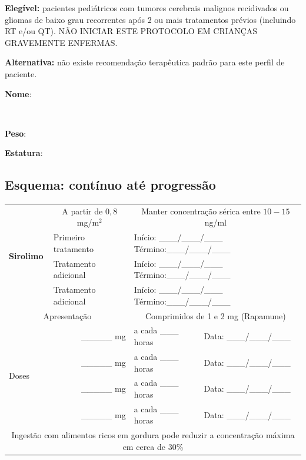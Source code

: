 \documentclass[11pt,a4paper,oldfontcommands]{memoir}
\def\entrywithlabel[#1]#2{\parbox{#1}{{\small #2:} \hrulefill}}
\begin{document}
\textbf{Elegível:} pacientes pediátricos com tumores cerebrais malignos recidivados ou gliomas de baixo grau recorrentes após 2 ou mais tratamentos prévios (incluindo RT e/ou QT). NÃO INICIAR ESTE PROTOCOLO EM CRIANÇAS GRAVEMENTE ENFERMAS.

\textbf{Alternativa:} não existe recomendação terapêutica padrão para este perfil de paciente.
\\[0.4cm]
\entrywithlabel[1\hsize]{\textbf{Nome}}\hfill
\\[0.3cm]
\entrywithlabel[.45\hsize]{\textbf{Peso}}\hfill  \entrywithlabel[.45\hsize]{\textbf{Estatura}}

\subsection{Esquema: contínuo até progressão}
\begin{center}
\begin{table}[H]
	\begin{tabular}{p{2.0cm}|p{4.0cm}|p{5.0cm}p{3.5cm}}
    \hline
		\multirow{4}{*}{\textbf{Sirolimo}}&\multicolumn{1}{c|}{A partir de \(0,8\) mg/m\(^2\)}&\multicolumn{2}{c}{Manter concentração sérica entre \(10-15\) ng/ml}\\
		{}&{Primeiro tratamento}&\multicolumn{2}{l}{Início: \_\_\_/\_\_\_/\_\_\_ Término:\_\_\_/\_\_\_/\_\_\_}\\
		{}&{Tratamento adicional}&\multicolumn{2}{l}{Início: \_\_\_/\_\_\_/\_\_\_ Término:\_\_\_/\_\_\_/\_\_\_}\\
		{}&{Tratamento adicional}&\multicolumn{2}{l}{Início: \_\_\_/\_\_\_/\_\_\_ Término:\_\_\_/\_\_\_/\_\_\_}\\
    \hline
		\multicolumn{2}{c|}{Apresentação}&\multicolumn{2}{c}{Comprimidos de 1 e 2 mg (Rapamune)}\\
    \hline
		\multirow{4}{*}{Doses}&\multicolumn{1}{r}{\_\_\_\_\_ mg}&{a cada \_\_\_ horas}&{Data: \_\_\_/\_\_\_/\_\_\_}\\
		{}&\multicolumn{1}{r}{\_\_\_\_\_ mg}&{a cada \_\_\_ horas}&{Data: \_\_\_/\_\_\_/\_\_\_}\\
		{}&\multicolumn{1}{r}{\_\_\_\_\_ mg}&{a cada \_\_\_ horas}&{Data: \_\_\_/\_\_\_/\_\_\_}\\
		{}&\multicolumn{1}{r}{\_\_\_\_\_ mg}&{a cada \_\_\_ horas}&{Data: \_\_\_/\_\_\_/\_\_\_}\\
    \hline
    \multicolumn{4}{c}{Ingestão com alimentos ricos em gordura  pode reduzir a concentração máxima em cerca de 30\%}\\
    \hline
\end{tabular}
\end{table}
\end{center}
\cleardoublepage
\end{document}
